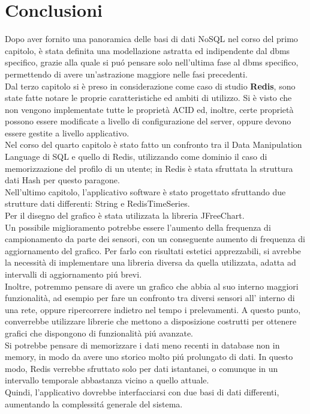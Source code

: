 \chapter{Conclusioni}
Dopo aver fornito una panoramica delle basi di dati NoSQL nel corso del primo capitolo,
è stata definita una modellazione astratta ed indipendente dal dbms specifico, grazie alla quale si puó pensare solo nell'ultima fase
al dbms specifico, permettendo di avere un'astrazione maggiore nelle fasi precedenti.\\
Dal terzo capitolo si è preso in considerazione come caso di studio \textbf{Redis}, sono state fatte notare le proprie caratteristiche
ed ambiti di utilizzo. Si è visto che non vengono implementate tutte le proprietà ACID ed, inoltre, certe proprietà
possono essere modificate a livello di configurazione del server, oppure devono essere gestite a livello applicativo.\\
Nel corso del quarto capitolo è stato fatto un confronto tra il Data Manipulation Language di SQL
e quello di Redis, utilizzando come dominio il caso di memorizzazione del profilo di un utente;
in Redis è stata sfruttata la struttura dati Hash per questo paragone.\\
Nell'ultimo capitolo, l'applicativo software è stato progettato sfruttando due strutture dati differenti: String e RedisTimeSeries.\\
Per il disegno del grafico è stata utilizzata la libreria JFreeChart.\\
Un possibile miglioramento potrebbe essere l'aumento della frequenza di campionamento da parte dei sensori, con un conseguente aumento di frequenza di aggiornamento del grafico.
Per farlo con risultati estetici apprezzabili, si avrebbe la necessità
di implementare una libreria diversa da quella utilizzata, adatta ad intervalli di aggiornamento piú brevi.\\
Inoltre, potremmo pensare di avere un grafico che abbia al suo interno maggiori funzionalità, ad esempio per fare un confronto tra diversi sensori all' interno di una rete, oppure
ripercorrere indietro nel tempo i prelevamenti.
A questo punto, converrebbe utilizzare librerie che mettono a disposizione costrutti per ottenere grafici che dispongono di funzionalità piú avanzate.\\
Si potrebbe pensare di memorizzare i dati meno recenti in database non in memory, in modo da avere uno storico molto piú prolungato di dati.
In questo modo, Redis verrebbe sfruttato solo per dati istantanei, o comunque in un intervallo temporale abbastanza vicino a quello attuale.\\
Quindi, l'applicativo dovrebbe interfacciarsi con due basi di dati differenti, aumentando la complessitá generale del sistema.
